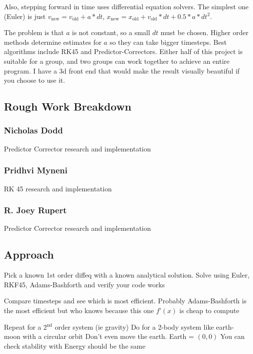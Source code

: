\documentclass[12pt, letterpaper]{article}
\begin{document}
Also, stepping forward in time uses differential equation solvers. The simplest one (Euler) is just \(v_{\text{new}} = v_{\text{old}} + a*dt\), \(x_{\text{new}} = x_{\text{old}} + v_{\text{old}}*dt + 0.5*a*dt^2\).

The problem is that \(a\) is not constant, so a small \(dt\) must be chosen. Higher order methods determine estimates for \(a\) so they can take bigger timesteps. Best algorithms include RK45 and Predictor-Correctors. Either half of this project is suitable for a group, and two groups can work together to achieve an entire program. I have a 3d front end that would make the result visually beautiful if you choose to use it.

\subsection{Rough Work Breakdown}

\subsubsection{Nicholas Dodd}
Predictor Corrector research and implementation

\subsubsection{Pridhvi Myneni}
RK 45 research and implementation

\subsubsection{R. Joey Rupert}
Predictor Corrector research and implementation


\subsection{Approach}

Pick a known 1st order diffeq with a known analytical solution.
Solve using Euler, RKF45, Adams-Bashforth and verify your code works

Compare timesteps and see which is most efficient. Probably Adams-Bashforth is the most efficient but who knows because this one \(f’(x)\) is cheap to compute

Repeat for a 2\(^{\text{nd}}\) order system (ie gravity)
Do for a 2-body system like earth-moon with a circular orbit
Don’t even move the earth. Earth = \((0,0)\)
You can check stability with
Energy should be the same
\end{document}
